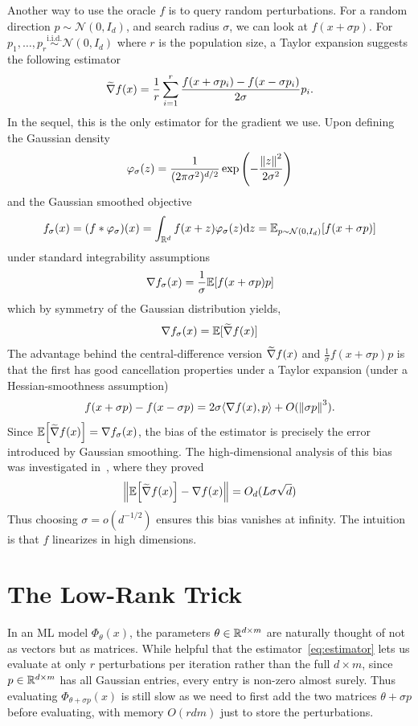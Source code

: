 Another way to use the oracle $f$ is to query random perturbations. For a random direction $p \sim \mathcal N(0,I_d)$, and search radius $\sigma$, we can look at $f(x+\sigma p)$. For $p_1, \ldots, p_r \overset{\mathrm{i.i.d.}}{\sim} \mathcal N(0,I_d)$ where $r$ is the population size, a Taylor expansion suggests the following estimator
\begin{align}
    \label{eq:estimator}
    \widetilde{\nabla} f(x) = \frac 1r \sum_{i=1}^r \frac{f(x+\sigma p_i) - f(x-\sigma p_i)}{2\sigma} p_i.
\end{align}
In the sequel, this is the only estimator for the gradient we use. Upon defining the Gaussian density 
\begin{align*}
    \varphi_\sigma(z) = \frac{1}{(2\pi \sigma^2)^{d/2}} \exp\left(-\frac{\left\lVert z \right\rVert^2}{2\sigma^2}\right)
\end{align*}
and the Gaussian smoothed objective
\begin{align*}
    f_\sigma(x) = (f * \varphi_\sigma)(x) = \int_{\mathbb{R}^d} f(x+z)\varphi_\sigma(z) \dd z = \mathbb{E}_{p \sim \mathcal N(0,I_d)}[f(x+\sigma p)]
\end{align*}
under standard integrability assumptions
\begin{align*}
    \nabla f_\sigma(x) = \frac{1}{\sigma} \mathbb{E}\qty[f(x+\sigma p)p]
\end{align*}
which by symmetry of the Gaussian distribution yields,
\begin{align*}
    \nabla f_\sigma(x) = \mathbb{E}[\widetilde{\nabla} f(x)]
\end{align*}
The advantage behind the central-difference version $\widetilde{\nabla} f(x)$ and $\frac{1}{\sigma} f(x+\sigma p)p$ is that the first has good cancellation properties under a Taylor expansion (under a Hessian-smoothness assumption)
\begin{align*}
    f(x+\sigma p) - f(x-\sigma p) = 2\sigma \langle \nabla f(x), p \rangle + O(\left\lVert \sigma p \right\rVert^3).
\end{align*}
Since $\mathbb{E}\qty[\widetilde{\nabla} f(x)] = \nabla f_\sigma(x)$, the bias of the estimator is precisely the error introduced by Gaussian smoothing. The high-dimensional analysis of this bias was investigated in~\cite{sarkar2025evolution}, where they proved 
\begin{align*}
    \left\lVert \mathbb{E}\qty[\widetilde{\nabla} f(x)] - \nabla f(x) \right\rVert = O_d(L \sigma \sqrt{d})
\end{align*}
Thus choosing $\sigma = o(d^{-1/2})$ ensures this bias vanishes at infinity. The intuition is that $f$ linearizes in high dimensions.
\section{The Low-Rank Trick}
In an ML model $\Phi_\theta(x)$, the parameters $\theta \in \mathbb{R}^{d \times m}$ are naturally thought of not as vectors but as matrices. While helpful that the estimator~\eqref{eq:estimator} lets us evaluate at only $r$ perturbations per iteration rather than the full $d \times m$, since $p \in \mathbb{R}^{d \times m}$ has all Gaussian entries, every entry is non-zero almost surely. Thus evaluating $\Phi_{\theta + \sigma p}(x)$ is still slow as we need to first add the two matrices $\theta + \sigma p$ before evaluating, with memory $O(rdm)$ just to store the perturbations.

